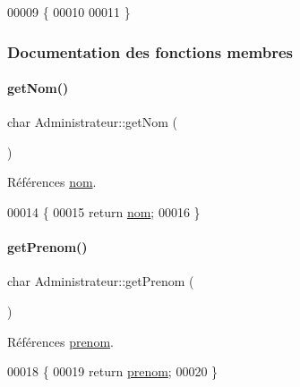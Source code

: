 \begin{DoxyCode}
00009 \{
00010 
00011 \}
\end{DoxyCode}


\subsubsection{Documentation des fonctions membres}
\mbox{\label{class_administrateur_a52d72cdd1bb1be507894c301ad56bc41}} 
\paragraph{\texorpdfstring{get\+Nom()}{getNom()}}
{\footnotesize\ttfamily char Administrateur\+::get\+Nom (\begin{DoxyParamCaption}{ }\end{DoxyParamCaption})}



Références \hyperlink{class_administrateur_add094b9c6e352f62dda4802da530eeef}{nom}.


\begin{DoxyCode}
00014 \{
00015     \textcolor{keywordflow}{return} \hyperlink{class_administrateur_add094b9c6e352f62dda4802da530eeef}{nom};
00016 \}
\end{DoxyCode}
\mbox{\label{class_administrateur_a05a90b3a0185837ac81da4b8411f82bb}} 
\paragraph{\texorpdfstring{get\+Prenom()}{getPrenom()}}
{\footnotesize\ttfamily char Administrateur\+::get\+Prenom (\begin{DoxyParamCaption}{ }\end{DoxyParamCaption})}



Références \hyperlink{class_administrateur_a1cb0671f334a62649e3fc147cc8c97e8}{prenom}.


\begin{DoxyCode}
00018 \{
00019     \textcolor{keywordflow}{return} \hyperlink{class_administrateur_a1cb0671f334a62649e3fc147cc8c97e8}{prenom};
00020 \}
\end{DoxyCode}
\mbox{\label{class_administrateur_a7af923f28608df559c8d1768e5be036a}} 
